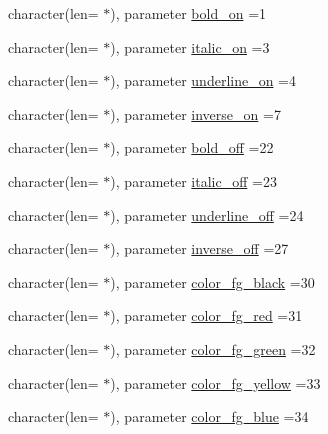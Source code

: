 \begin{DoxyCompactItemize}
\item 
character(len= $\ast$), parameter \mbox{\hyperlink{namespacem__escape_a8f30470c66af08cf881d9afe23357a03}{bold\+\_\+on}} =\textquotesingle{}1\textquotesingle{}
\item 
character(len= $\ast$), parameter \mbox{\hyperlink{namespacem__escape_a5bd07ea0cedbfd7d0e04b3b0be74821f}{italic\+\_\+on}} =\textquotesingle{}3\textquotesingle{}
\item 
character(len= $\ast$), parameter \mbox{\hyperlink{namespacem__escape_a6f4bcc5f8acb0683ed6d8e05c0100daa}{underline\+\_\+on}} =\textquotesingle{}4\textquotesingle{}
\item 
character(len= $\ast$), parameter \mbox{\hyperlink{namespacem__escape_afacdc9d33171b768ee026b1eb6726f8a}{inverse\+\_\+on}} =\textquotesingle{}7\textquotesingle{}
\item 
character(len= $\ast$), parameter \mbox{\hyperlink{namespacem__escape_a978fe9a5d07621c57c3163d8a7a62118}{bold\+\_\+off}} =\textquotesingle{}22\textquotesingle{}
\item 
character(len= $\ast$), parameter \mbox{\hyperlink{namespacem__escape_a93fc5a4e6f0ed044c9f6cf29412a05cb}{italic\+\_\+off}} =\textquotesingle{}23\textquotesingle{}
\item 
character(len= $\ast$), parameter \mbox{\hyperlink{namespacem__escape_a9e36a1a9bd4a64702ecef4a2e3d592b9}{underline\+\_\+off}} =\textquotesingle{}24\textquotesingle{}
\item 
character(len= $\ast$), parameter \mbox{\hyperlink{namespacem__escape_affae80c7d63858227a9f3134e6191f96}{inverse\+\_\+off}} =\textquotesingle{}27\textquotesingle{}
\item 
character(len= $\ast$), parameter \mbox{\hyperlink{namespacem__escape_a6c7b72b2cfc0a6ec7fc4080ad6750d99}{color\+\_\+fg\+\_\+black}} =\textquotesingle{}30\textquotesingle{}
\item 
character(len= $\ast$), parameter \mbox{\hyperlink{namespacem__escape_a35eecf0fb916821d94b9c47b2045fe44}{color\+\_\+fg\+\_\+red}} =\textquotesingle{}31\textquotesingle{}
\item 
character(len= $\ast$), parameter \mbox{\hyperlink{namespacem__escape_aeab9b03c1de2c6fb13031c9ca55f9105}{color\+\_\+fg\+\_\+green}} =\textquotesingle{}32\textquotesingle{}
\item 
character(len= $\ast$), parameter \mbox{\hyperlink{namespacem__escape_accc5b67f05d8a2b02ca6f4a0ba38e581}{color\+\_\+fg\+\_\+yellow}} =\textquotesingle{}33\textquotesingle{}
\item 
character(len= $\ast$), parameter \mbox{\hyperlink{namespacem__escape_a01075e619c6af06aac80d73f32263439}{color\+\_\+fg\+\_\+blue}} =\textquotesingle{}34\textquotesingle{}

\end{DoxyCompactItemize}
